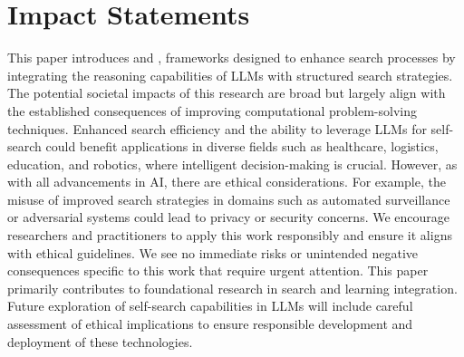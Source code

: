 \section{Impact Statements}
This paper introduces \method and \cmethod, frameworks designed to enhance search processes by integrating the reasoning capabilities of LLMs with structured search strategies. 
The potential societal impacts of this research are broad but largely align with the established consequences of improving computational problem-solving techniques. Enhanced search efficiency and the ability to leverage LLMs for self-search could benefit applications in diverse fields such as healthcare, logistics, education, and robotics, where intelligent decision-making is crucial. 
However, as with all advancements in AI, there are ethical considerations. For example, the misuse of improved search strategies in domains such as automated surveillance or adversarial systems could lead to privacy or security concerns. We encourage researchers and practitioners to apply this work responsibly and ensure it aligns with ethical guidelines.
We see no immediate risks or unintended negative consequences specific to this work that require urgent attention. This paper primarily contributes to foundational research in search and learning integration. Future exploration of self-search capabilities in LLMs will include careful assessment of ethical implications to ensure responsible development and deployment of these technologies.